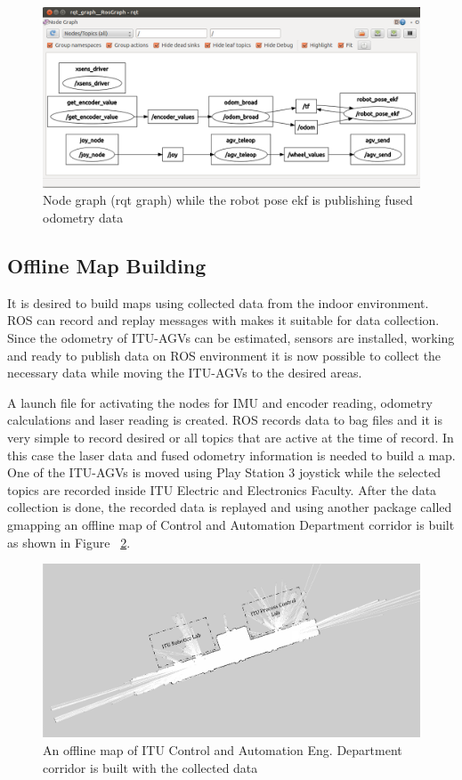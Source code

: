 	\begin{figure}
		\centering
		\includegraphics[scale=0.42]{images/ekf-graph}
		\caption{Node graph (rqt graph) while the robot pose ekf is publishing fused odometry data}
		\label{fig:ekf-graph}
	\end{figure}
				 
	\subsection{Offline Map Building}
	\label{subsec:offline mapping}					
	It is desired to build maps using collected data from the indoor environment. ROS can record and replay messages with makes it suitable for data collection. Since the odometry of ITU-AGVs can be estimated, sensors are installed, working and ready to publish data on ROS environment it is now possible to collect the necessary data while moving the ITU-AGVs to the desired areas. 
	\par
	A launch file for activating the nodes for IMU and encoder reading, odometry calculations and laser reading is created. 
	ROS records data to bag files and it is very simple to record desired or all topics that are active at the time of record. In this case the laser data and fused odometry information is needed to build a map. One of the ITU-AGVs is moved using Play Station 3 joystick while the selected topics are recorded inside ITU Electric and Electronics Faculty. After the data collection is done, the recorded data is replayed and using another package called gmapping an offline map of Control and Automation Department corridor is built as shown in Figure ~\ref{fig:map}.
	\begin{figure}
		\centering
		\includegraphics[scale=0.53]{images/map}
		\caption{An offline map of ITU Control and Automation Eng. Department corridor is built with the collected data}
		\label{fig:map}
	\end{figure}				